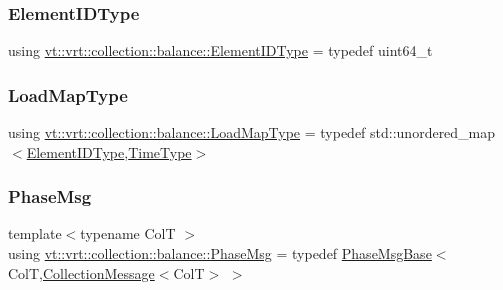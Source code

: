 \mbox{\label{namespacevt_1_1vrt_1_1collection_1_1balance_a14c8d2c972f2913aa3f1636e5be0a120}} 
\subsubsection{\texorpdfstring{Element\+I\+D\+Type}{ElementIDType}}
{\footnotesize\ttfamily using \hyperlink{namespacevt_1_1vrt_1_1collection_1_1balance_a14c8d2c972f2913aa3f1636e5be0a120}{vt\+::vrt\+::collection\+::balance\+::\+Element\+I\+D\+Type} = typedef uint64\+\_\+t}

\mbox{\label{namespacevt_1_1vrt_1_1collection_1_1balance_a45306ee4bf38fe3fb586d1ee2fa3d147}} 
\subsubsection{\texorpdfstring{Load\+Map\+Type}{LoadMapType}}
{\footnotesize\ttfamily using \hyperlink{namespacevt_1_1vrt_1_1collection_1_1balance_a45306ee4bf38fe3fb586d1ee2fa3d147}{vt\+::vrt\+::collection\+::balance\+::\+Load\+Map\+Type} = typedef std\+::unordered\+\_\+map$<$\hyperlink{namespacevt_1_1vrt_1_1collection_1_1balance_a14c8d2c972f2913aa3f1636e5be0a120}{Element\+I\+D\+Type},\hyperlink{namespacevt_a876a9d0cd5a952859c72de8a46881442}{Time\+Type}$>$}

\mbox{\label{namespacevt_1_1vrt_1_1collection_1_1balance_a7120dc064f6e8c4157a5f4c81b825393}} 
\subsubsection{\texorpdfstring{Phase\+Msg}{PhaseMsg}}
{\footnotesize\ttfamily template$<$typename ColT $>$ \\
using \hyperlink{namespacevt_1_1vrt_1_1collection_1_1balance_a7120dc064f6e8c4157a5f4c81b825393}{vt\+::vrt\+::collection\+::balance\+::\+Phase\+Msg} = typedef \hyperlink{structvt_1_1vrt_1_1collection_1_1balance_1_1_phase_msg_base}{Phase\+Msg\+Base}$<$ColT,\hyperlink{structvt_1_1vrt_1_1collection_1_1_collection_message}{Collection\+Message}$<$ColT$>$ $>$}

